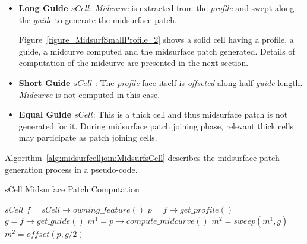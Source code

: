 \begin{itemize}[noitemsep,topsep=2pt,parsep=2pt,partopsep=2pt]

\item {\bf Long Guide $sCell$}: {\em Midcurve} is extracted from the {\em profile} and swept along the {\em guide} to generate the midsurface patch.




Figure~\ref{figure_MidsurfSmallProfile_2} shows a solid cell having a profile, a guide, a midcurve computed and the midsurface patch generated. Details of computation of the midcurve are presented in the next section.

\item {\bf Short Guide $sCell$} : The {\em profile} face itself is {\em offseted} along half {\em guide} length. {\em Midcurve} is not computed  in this case.  

\item {\bf Equal Guide $sCell$}:  This is a thick cell and thus midsurface patch is not generated for it. During midsurface patch joining phase, relevant thick cells may participate as patch joining cells.

\end{itemize}


Algorithm~\ref{alg:midsurfcelljoin:MidsurfsCell} describes the midsurface patch generation process in a pseudo-code. 

\bigskip


		\begin{algorithm}[H]
		\caption{sCell Midsurface Patch Computation}
		\label{alg:midsurfcelljoin:MidsurfsCell}
		\begin{algorithmic}[1]
			\REQUIRE $sCell$
			\STATE $f = sCell \rightarrow owning\_feature()$
			\STATE $p = f \rightarrow get\_profile()$
			\STATE $g = f \rightarrow get\_guide()$
				\STATE $m^1 = p\rightarrow compute\_midcurve()$
				\STATE $m^2 = sweep(m^1 ,g)$
				\STATE $m^2 = offset(p ,g/2)$
			\ENDIF
		\end{algorithmic}
	\end{algorithm}

